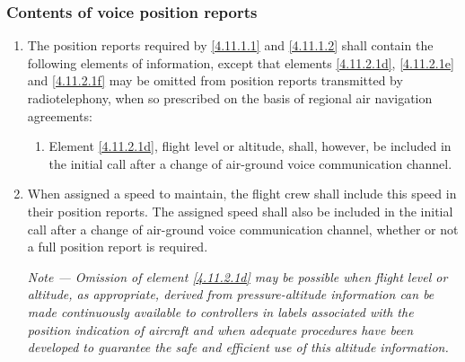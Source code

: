 \documentclass[../main.tex]{subfiles}
\begin{document}
    \subsubsection{Contents of voice position reports}

    \begin{enumerate}
        \item The position reports required by \ref{4.11.1.1} and \ref{4.11.1.2} shall contain the following elements of information, except that elements \ref{4.11.2.1d}, \ref{4.11.2.1e} and \ref{4.11.2.1f} may be omitted from position reports transmitted by radiotelephony, when so prescribed on the basis of regional air navigation agreements:


        \begin{enumerate}
            \item Element \ref{4.11.2.1d}, flight level or altitude, shall, however, be included in the initial call after a change of air-ground voice communication channel.
        \end{enumerate}

        \item When assigned a speed to maintain, the flight crew shall include this speed in their position reports. The assigned speed shall also be included in the initial call after a change of air-ground voice communication channel, whether or not a full position report is required.

        \textit{Note --- Omission of element \ref{4.11.2.1d} may be possible when flight level or altitude, as appropriate, derived from pressure-altitude information can be made continuously available to controllers in labels associated with the position indication of aircraft and when adequate procedures have been developed to guarantee the safe and efficient use of this altitude information.}
    \end{enumerate}
\end{document}
